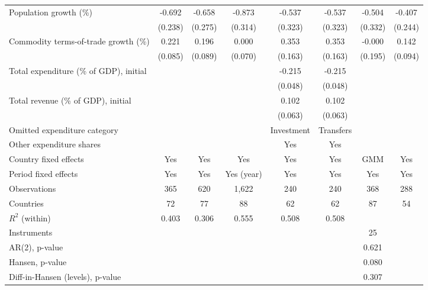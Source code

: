 \begin{table}[htbp]
\begin{tabular}{l*{7}{c}}
Population growth (\%) & -0.692\sym{***} & -0.658\sym{**} & -0.873\sym{***} & -0.537 & -0.537 & -0.504 & -0.407 \\
 & (0.238) & (0.275) & (0.314) & (0.323) & (0.323) & (0.332) & (0.244) \\
Commodity terms-of-trade growth (\%) & 0.221\sym{**} & 0.196\sym{**} & 0.000 & 0.353\sym{**} & 0.353\sym{**} & -0.000 & 0.142 \\
 & (0.085) & (0.089) & (0.070) & (0.163) & (0.163) & (0.195) & (0.094) \\
Total expenditure (\% of GDP), initial &  &  &  & -0.215\sym{***} & -0.215\sym{***} &  &  \\
 &  &  &  & (0.048) & (0.048) &  &  \\
Total revenue (\% of GDP), initial &  &  &  & 0.102 & 0.102 &  &  \\
 &  &  &  & (0.063) & (0.063) &  &  \\
\midrule
Omitted expenditure category &  &  &  & Investment & Transfers &  &  \\
Other expenditure shares &  &  &  & Yes & Yes &  &  \\
Country fixed effects & Yes & Yes & Yes & Yes & Yes & GMM & Yes \\
Period fixed effects & Yes & Yes & Yes (year) & Yes & Yes & Yes & Yes \\
Observations & 365 & 620 & 1,622 & 240 & 240 & 368 & 288 \\
Countries & 72 & 77 & 88 & 62 & 62 & 87 & 54 \\
$R^2$ (within) & 0.403 & 0.306 & 0.555 & 0.508 & 0.508 &  &  \\
Instruments &  &  &  &  &  & 25 &  \\
AR(2), p-value &  &  &  &  &  & 0.621 &  \\
Hansen, p-value &  &  &  &  &  & 0.080 &  \\
Diff-in-Hansen (levels), p-value &  &  &  &  &  & 0.307 &  \\
\bottomrule
\end{tabular}

\end{table}
